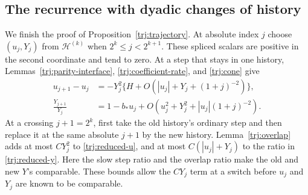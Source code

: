 \subsection{The recurrence with dyadic changes of history}

We finish the proof of Proposition~\ref{trj:trajectory}.  At absolute
index \(j\) choose \((u_j,Y_j)\) from \(\mathcal H^{(k)}\) when
\(2^k\le j<2^{k+1}\).  These spliced scalars are positive in the
second coordinate and tend to zero.  At a step that stays in one history,
Lemmas~\ref{trj:parity-interface}, \ref{trj:coefficient-rate}, and
\ref{trj:cone} give
\begin{align}
 u_{j+1}-u_j
   &=-Y_j^2\{H+O(|u_j|+Y_j+(1+j)^{-2})\},
                                      \label{trj:reduced-u}\\
 \frac{Y_{j+1}}{Y_j}
   &=1-b_*u_j+O(u_j^2+Y_j^2+|u_j|(1+j)^{-2}).
                                      \label{trj:reduced-y}
\end{align}
At a crossing \(j+1=2^k\), first take the old history's ordinary step
and then replace it at the same absolute \(j+1\) by the new history.
Lemma~\ref{trj:overlap} adds at most \(C Y_j^2\) to
\eqref{trj:reduced-u}, and at most \(C(|u_j|+Y_j)\) to the ratio in
\eqref{trj:reduced-y}.  Here the slow step ratio and the overlap ratio
make the old and new \(Y\)'s comparable.  These bounds allow the
\(CY_j\) term at a switch before \(u_j\) and \(Y_j\) are known to be
comparable.

